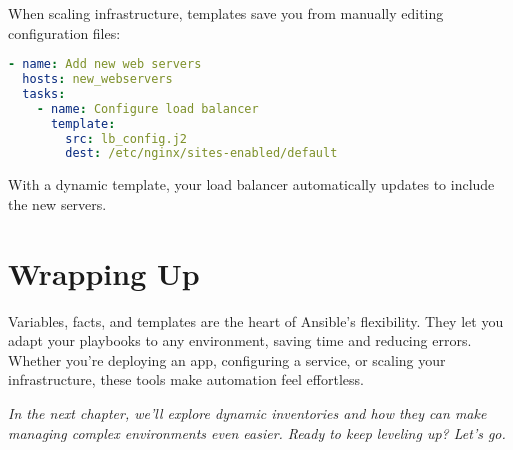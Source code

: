 When scaling infrastructure, templates save you from manually editing configuration files:
\begin{lstlisting}[language=yaml, caption=Scaling Infrastructure Playbook]
- name: Add new web servers
  hosts: new_webservers
  tasks:
    - name: Configure load balancer
      template:
        src: lb_config.j2
        dest: /etc/nginx/sites-enabled/default
\end{lstlisting}

With a dynamic template, your load balancer automatically updates to include the new servers.


\section{Wrapping Up}

Variables, facts, and templates are the heart of Ansible's flexibility. They let you adapt your playbooks to any environment, saving time and reducing errors. Whether you're deploying an app, configuring a service, or scaling your infrastructure, these tools make automation feel effortless.

\vspace{1em}

\textit{In the next chapter, we'll explore dynamic inventories and how they can make managing complex environments even easier. Ready to keep leveling up? Let's go.}
